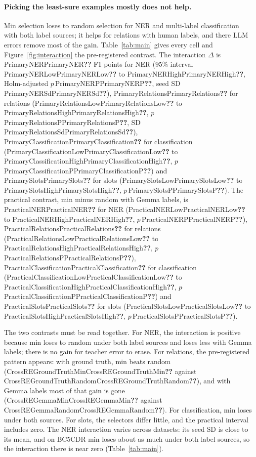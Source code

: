 \documentclass[11pt]{article}
\newcommand{\res}[1]{\ifcsname #1\endcsname\csname #1\endcsname\else\textbf{??}\fi}
\begin{document}
\paragraph{Picking the least-sure examples mostly does not help.} Min selection loses to random selection for NER and multi-label classification with both label sources; it helps for relations with human labels, and there LLM errors remove most of the gain. Table~\ref{tab:main} gives every cell and Figure~\ref{fig:interaction} the pre-registered contrast. The interaction $\Delta$ is \res{PrimaryNER} F1 points for NER (95\% interval \res{PrimaryNERLow} to \res{PrimaryNERHigh}, Holm-adjusted $p$\,\res{PrimaryNERP}, seed SD \res{PrimaryNERSd}), \res{PrimaryRelations} for relations (\res{PrimaryRelationsLow} to \res{PrimaryRelationsHigh}, $p$\,\res{PrimaryRelationsP}, SD \res{PrimaryRelationsSd}), \res{PrimaryClassification} for classification (\res{PrimaryClassificationLow} to \res{PrimaryClassificationHigh}, $p$\,\res{PrimaryClassificationP}) and \res{PrimarySlots} for slots (\res{PrimarySlotsLow} to \res{PrimarySlotsHigh}, $p$\,\res{PrimarySlotsP}). The practical contrast, min minus random with Gemma labels, is \res{PracticalNER} for NER (\res{PracticalNERLow} to \res{PracticalNERHigh}, $p$\,\res{PracticalNERP}), \res{PracticalRelations} for relations (\res{PracticalRelationsLow} to \res{PracticalRelationsHigh}, $p$\,\res{PracticalRelationsP}), \res{PracticalClassification} for classification (\res{PracticalClassificationLow} to \res{PracticalClassificationHigh}, $p$\,\res{PracticalClassificationP}) and \res{PracticalSlots} for slots (\res{PracticalSlotsLow} to \res{PracticalSlotsHigh}, $p$\,\res{PracticalSlotsP}).

The two contrasts must be read together. For NER, the interaction is positive because min loses to random under both label sources and loses less with Gemma labels; there is no gain for teacher error to erase. For relations, the pre-registered pattern appears: with ground truth, min beats random (\res{CrossREGroundTruthMin} against \res{CrossREGroundTruthRandom}), and with Gemma labels most of that gain is gone (\res{CrossREGemmaMin} against \res{CrossREGemmaRandom}). For classification, min loses under both sources. For slots, the selectors differ little, and the practical interval includes zero. The NER interaction varies across datasets: its seed SD is close to its mean, and on BC5CDR min loses about as much under both label sources, so the interaction there is near zero (Table~\ref{tab:main}).
\end{document}
